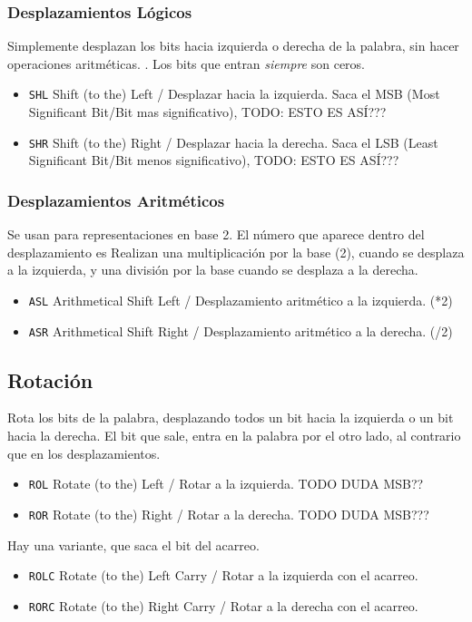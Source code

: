 \documentclass[a4paper,11pt,spanish]{report}
\begin{document}
\subsubsection{Desplazamientos Lógicos}
Simplemente desplazan los bits hacia izquierda o derecha de la palabra, sin hacer operaciones aritméticas. . Los bits que entran \emph{siempre} son ceros.
\begin{itemize}
\item \verb|SHL| \textrightarrow Shift (to the) Left / Desplazar hacia la izquierda. Saca el MSB (Most Significant Bit/Bit mas significativo), TODO: ESTO ES ASÍ???
\item \verb|SHR| \textrightarrow Shift (to the) Right / Desplazar hacia la derecha. Saca el LSB (Least Significant Bit/Bit menos significativo), TODO: ESTO ES ASÍ???
\end{itemize}
\subsubsection{Desplazamientos Aritméticos}
Se usan para representaciones en base 2. El número que aparece dentro del desplazamiento es
Realizan una multiplicación por la base (2), cuando se desplaza a la izquierda, y una división por la base cuando se desplaza a la derecha.
\begin{itemize}
\item \verb|ASL| \textrightarrow Arithmetical Shift Left / Desplazamiento aritmético a la izquierda. (*2)
\item \verb|ASR| \textrightarrow Arithmetical Shift Right / Desplazamiento aritmético a la derecha. (/2)
\end{itemize}
\subsection{Rotación}
Rota los bits de la palabra, desplazando todos un bit hacia la izquierda o un bit hacia la derecha. El bit que sale, entra en la palabra por el otro lado, al contrario que en los desplazamientos.
\begin{itemize}
\item \verb|ROL| \textrightarrow Rotate (to the) Left / Rotar a la izquierda. TODO DUDA MSB??
\item \verb|ROR| \textrightarrow Rotate (to the) Right / Rotar a la derecha. TODO DUDA MSB???
\end{itemize}
Hay una variante, que saca el bit del acarreo.
\begin{itemize}
\item \verb|ROLC| \textrightarrow Rotate (to the) Left Carry / Rotar a la izquierda con el acarreo.
\item \verb|RORC| \textrightarrow Rotate (to the) Right Carry / Rotar a la derecha con el acarreo.
\end{itemize}
\end{document}
